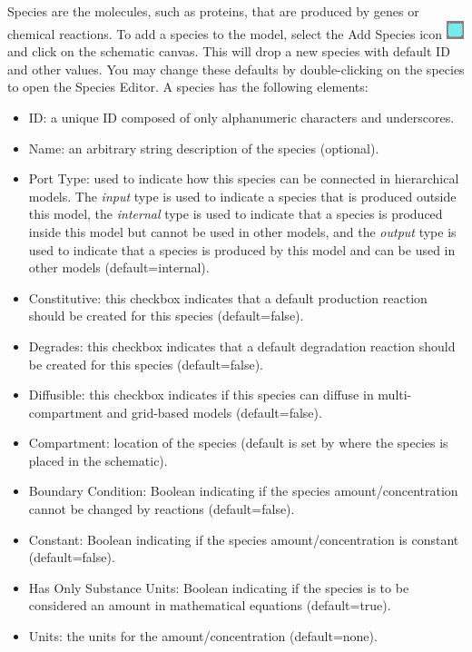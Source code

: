 \documentclass[titlepage,11pt]{article}
\begin{document}
\noindent
Species are the molecules, such as proteins, that are produced by genes or chemical reactions.  To add a species to the model, select the Add Species icon \includegraphics{../gui/icons/modelview/add_species_selected} and click on the schematic canvas.  This will drop a new species with default ID and other values.  You may change these defaults by double-clicking on the species to open the Species Editor.  A species has the following elements:
\begin{itemize} 
\item ID: a unique ID composed of only alphanumeric characters and underscores.
\item Name: an arbitrary string description of the species (optional).
\item Port Type: used to indicate how this species can be connected in hierarchical models.  The \emph{input} type is used to indicate a species that is produced outside this model, the \emph{internal} type is used to indicate that a species is produced inside this model but cannot be used in other models, and the \emph{output} type is used to indicate that a species is produced by this model and can be used in other models (default=internal). 
\item Constitutive: this checkbox indicates that a default production reaction should be created for this species (default=false).
\item Degrades: this checkbox indicates that a default degradation reaction should be created for this species (default=false).
\item Diffusible: this checkbox indicates if this species can diffuse in multi-compartment and grid-based models (default=false).
\item Compartment: location of the species (default is set by where the species is placed in the schematic).
\item Boundary Condition: Boolean indicating if the species amount/concentration cannot be changed by reactions (default=false).
\item Constant: Boolean indicating if the species amount/concentration is constant (default=false).
\item Has Only Substance Units: Boolean indicating if the species is to be considered an amount in mathematical equations (default=true).
\item Units: the units for the amount/concentration (default=none).

\end{itemize}
\end{document}
